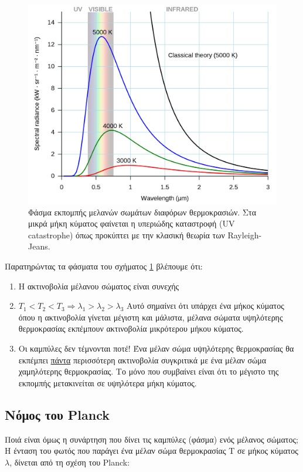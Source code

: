 \begin{figure}[h]
    \centering
    \includegraphics[width=\linewidth]{Figures/black_body_spectrum.png}
    \caption{Φάσμα εκπομπής μελανών σωμάτων διαφόρων θερμοκρασιών. Στα μικρά μήκη κύματος φαίνεται η υπεριώδης καταστροφή (UV catastrophe) όπως προκύπτει με την κλασική θεωρία των Rayleigh-Jeans.}
    \label{fig:black_body_spectrum}
\end{figure}

Παρατηρώντας τα φάσματα του σχήματος \ref{fig:black_body_spectrum} βλέπουμε ότι:

\begin{enumerate}
    \item Η ακτινοβολία μέλανου σώματος είναι συνεχής
    \item $T_1 < T_2 < T_3 \Rightarrow \lambda_1 > \lambda_2 > \lambda_3$
    Αυτό σημαίνει ότι υπάρχει ένα μήκος κύματος όπου η ακτινοβολία γίνεται μέγιστη και μάλιστα,  μέλανα σώματα υψηλότερης θερμοκρασίας εκπέμπουν ακτινοβολία μικρότερου μήκου κύματος.
    \item {\color{red} Οι καμπύλες δεν τέμνονται ποτέ!} Ένα μέλαν σώμα υψηλότερης θερμοκρασίας θα εκπέμπει \underline{πάντα} περισσότερη ακτινοβολία συγκριτικά με ένα μέλαν σώμα χαμηλότερης θερμοκρασίας. Το μόνο που συμβαίνει είναι ότι το μέγιστο της εκπομπής μετακινείται σε υψηλότερα μήκη κύματος.
\end{enumerate}

\subsection{Νόμος του Planck}
Ποιά είναι όμως η συνάρτηση που δίνει τις καμπύλες (φάσμα) ενός μέλανος σώματος;
Η ένταση του φωτός που παράγει ένα μέλαν σώμα θερμοκρασίας Τ σε μήκος κύματος $\lambda$, δίνεται από τη σχέση του Planck:

